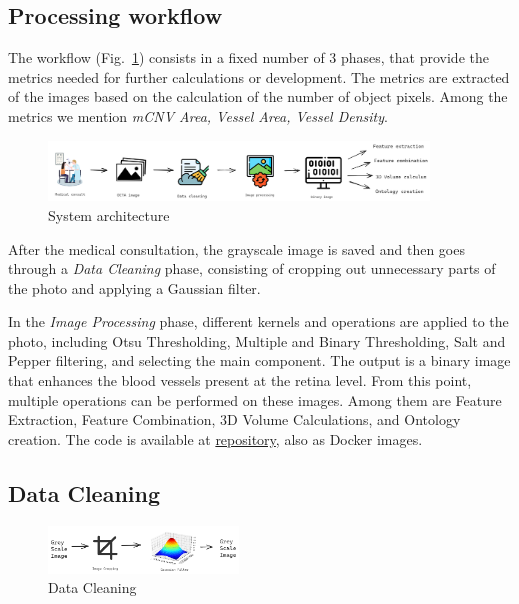 \documentclass[conference]{IEEEtran}
\begin{document}
\subsection{Processing workflow}
The workflow (Fig.~\ref{fig:sysarch}) consists in a fixed number of 3 phases, that provide the metrics needed for further calculations or development. The metrics are extracted of the images based on the calculation of the number of object pixels. Among the metrics we mention \textit{mCNV Area, Vessel Area, Vessel Density}.

\begin{figure}%
    \centering
    \includegraphics[width=0.9\textwidth]{fig/sysarch2.png}
    \caption{System architecture}
    \label{fig:sysarch}
\end{figure}

After the medical consultation, the grayscale image is saved and then goes through a \textit{Data Cleaning} phase, consisting of cropping out unnecessary parts of the photo and applying a Gaussian filter.

In the \textit{Image Processing} phase, different kernels and operations are applied to the photo, including Otsu Thresholding, Multiple and Binary Thresholding, Salt and Pepper filtering, and selecting the main component. The output is a binary image that enhances the blood vessels present at the retina level. From this point, multiple operations can be performed on these images. Among them are Feature Extraction, Feature Combination, 3D Volume Calculations, and Ontology creation. 
The code is available at \href{https://github.com/BBsimonaBB/Measuring-nAMD-biomarkers-from-OCTA-images}{repository}, also as Docker images.

\subsection{Data Cleaning}


\begin{figure}%
    \centering
    \includegraphics[width=0.45\textwidth]{fig/dataclean2.png}
    \caption{Data Cleaning}
    \label{fig:dc}
\end{figure}
\end{document}
